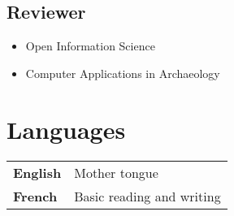 \documentclass[11pt, a4paper]{article}
\newcommand{\TablePad}{\vspace{-0.4cm}}
\begin{document}
\subsection{Reviewer}
\begin{itemize}
  \item Open Information Science
  \item Computer Applications in Archaeology
\end{itemize}

\section{Languages}

\TablePad
\begin{tabularx}{\textwidth}{@{}p{} p{}@{}}
  \textbf{English} & Mother tongue
  \\
  \textbf{French} & Basic reading and writing
\end{tabularx}
\end{document}
